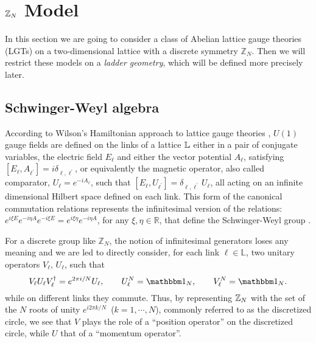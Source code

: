 \section{\texorpdfstring{$\mathbb{Z}_N$}{Z\_N} Model}%
\label{sec:model}
In this section we are going to consider a class of Abelian lattice gauge theories (LGTs) on a two-dimensional lattice
with a discrete symmetry $\mathbb Z_N$. Then we will restrict these models on a \emph{ladder geometry},
which will be defined more precisely later.

\subsection{Schwinger-Weyl algebra}%
\label{sub:schwinger_weyl_algebra}

According to Wilson's Hamiltonian approach to lattice gauge theories \cite{wilson1974confinement}, $U(1)$ gauge fields are defined on
the links of a lattice $\mathbb{L}$  either in a pair of conjugate variables,
the electric field  $E_\ell$ and either the vector potential $A_\ell$, satisfying  $[E_\ell, A_{\ell^{\prime}} ] = i \delta_{\ell , \ell^{\prime} }$, or equivalently the magnetic operator, also called comparator,
$U_\ell = e^{-i A_{\ell} }$, such that $[E_\ell, U_{\ell^{\prime} } ] =  \delta_{\ell , \ell^{\prime} } \, U_{\ell}$, all acting on an infinite dimensional Hilbert space defined on each link.
This form of the canonical commutation relations represents the infinitesimal version of the relations: $ e^{i\xi E} e^{-i\eta A } e^{-i\xi E} = e^{i\xi \eta} e^ {-i\eta A }$,
for any $\xi, \eta \in \mathbb{R}$,
that define the Schwinger-Weyl group \cite{notarnicola2015discrete, ercolessi2018znmodels, schwinger1960unitary}.

For a discrete group like $\mathbb Z_N$, the notion of infinitesimal generators loses any meaning and we are led to directly consider, for each link $\ell \in \mathbb L$, two unitary operators
$V_\ell, \, U_\ell$, such that \cite{schwinger1960unitary, schwinger2001symbolism}
\begin{equation}
    V_\ell U_\ell V_\ell^{\dagger}=e^{2\pi i/N}U_\ell, \qquad
    U_\ell^N=\One_N, \qquad
    V_\ell^N=\One_N.
    \label{eq:schwinger_weyl_algebra}
\end{equation}
while on different links they commute.
Thus, by representing $\mathbb{Z}_N$  with the set of the $N$ roots of unity $e^{i 2 \pi k/N}$\, ($k=1, \cdots, N$), commonly referred to as the discretized circle,
we see that $V$ plays the role of a ``position operator'' on the discretized circle, while $U$ that of a ``momentum operator''.


